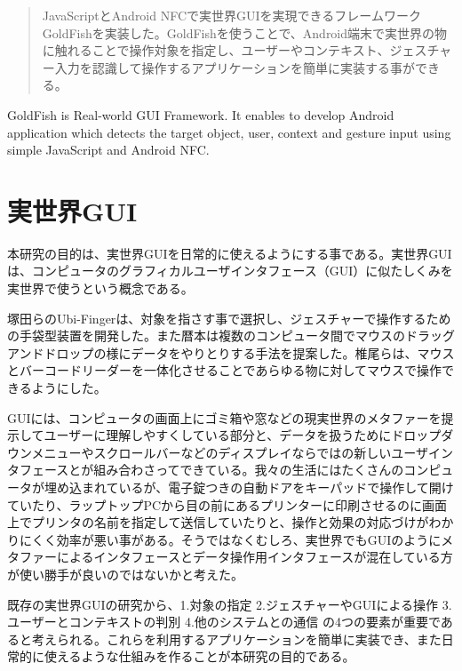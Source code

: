 
\begin{abstract}
JavaScriptとAndroid NFCで実世界GUIを実現できるフレームワーク GoldFishを実装した。GoldFishを使うことで、Android端末で実世界の物に触れることで操作対象を指定し、ユーザーやコンテキスト、ジェスチャー入力を認識して操作するアプリケーションを簡単に実装する事ができる。
\end{abstract}

\begin{eabstract}
GoldFish is Real-world GUI Framework. It enables to develop Android application which detects the target object, user, context and gesture input using simple JavaScript and Android NFC.
\end{eabstract}

\maketitle

\section{実世界GUI}\label{sec:Introduction}
本研究の目的は、実世界GUI\cite{実世界GUI}を日常的に使えるようにする事である。実世界GUIは、コンピュータのグラフィカルユーザインタフェース（GUI）に似たしくみを実世界で使うという概念である。

塚田らのUbi-Finger\cite{Ubi-Finger}は、対象を指さす事で選択し、ジェスチャーで操作するための手袋型装置を開発した。また暦本は複数のコンピュータ間でマウスのドラッグアンドドロップの様にデータをやりとりする手法\cite{pick-and-drop}を提案した。椎尾らは、マウスとバーコードリーダーを一体化させることであらゆる物に対してマウスで操作できるようにした。\cite{field-mouse}

GUIには、コンピュータの画面上にゴミ箱や窓などの現実世界のメタファーを提示してユーザーに理解しやすくしている部分と、データを扱うためにドロップダウンメニューやスクロールバーなどのディスプレイならではの新しいユーザインタフェースとが組み合わさってできている。我々の生活にはたくさんのコンピュータが埋め込まれているが、電子錠つきの自動ドアをキーパッドで操作して開けていたり、ラップトップPCから目の前にあるプリンターに印刷させるのに画面上でプリンタの名前を指定して送信していたりと、操作と効果の対応づけがわかりにくく効率が悪い事がある。そうではなくむしろ、実世界でもGUIのようにメタファーによるインタフェースとデータ操作用インタフェースが混在している方が使い勝手が良いのではないかと考えた。

既存の実世界GUIの研究から、1.対象の指定 2.ジェスチャーやGUIによる操作 3.ユーザーとコンテキストの判別 4.他のシステムとの通信 の4つの要素が重要であると考えられる。これらを利用するアプリケーションを簡単に実装でき、また日常的に使えるような仕組みを作ることが本研究の目的である。



